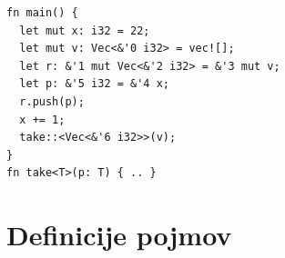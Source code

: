 \documentclass[a4paper,12pt,openright]{book}
\begin{document}
\begin{listing}[!ht]
	\begin{verbatim}
fn main() {
  let mut x: i32 = 22;
  let mut v: Vec<&'0 i32> = vec![];
  let r: &'1 mut Vec<&'2 i32> = &'3 mut v;
  let p: &'5 i32 = &'4 x;
  r.push(p);
  x += 1;
  take::<Vec<&'6 i32>>(v);
}
fn take<T>(p: T) { .. }
\end{verbatim}
	\caption{Primer programa za Polonius}
	\label{listing:primerPolonius}
\end{listing}


\section{Definicije pojmov}
\end{document}
